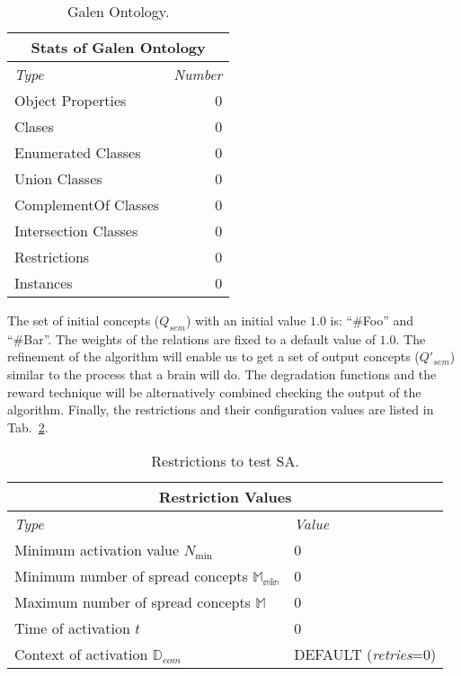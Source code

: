 \begin{longtable}[c]{|l|r|} 
\caption{Galen Ontology.}\label{table:info-ontologia}\\    
\hline
  \multicolumn{2}{|c|}{\textbf{Stats of Galen Ontology}}\\ \hline
  \textit{Type} &  \textit{Number} \\\hline

\endhead

    Object Properties&0 \\ \hline    
    Clases&0 \\ \hline
    Enumerated Classes&0 \\ \hline
    Union Classes&0 \\ \hline
    ComplementOf Classes&0 \\ \hline
    Intersection Classes&0 \\ \hline
    Restrictions&0 \\ \hline    
    Instances&0\\ \hline
\end{longtable}

The set of initial concepts ($Q_{sem}$) with an initial value $1.0$ is: ``\#Foo'' and ``\#Bar''. The weights of the 
relations are fixed to a default value of $1.0$. The refinement of the algorithm will enable us to get
a set of output concepts ($Q'_{sem}$) similar to the process that a brain will do. The degradation functions
and the reward technique will be alternatively combined checking the output of the algorithm. Finally, the restrictions 
and their configuration values are listed in Tab.~\ref{tabla:test-restricciones}.

\begin{table}[htb]
\renewcommand{\arraystretch}{1.3}
\begin{center}
\begin{tabular}{|p{8cm}|p{2cm}|}
\hline
        \multicolumn{2}{|c|}{\textbf{Restriction Values}}\\        
        \hline
        \textit{Type} &  \textit{Value} \\ \hline
    Minimum activation value $N_{\min}$ &0 \\ \hline
    Minimum number of spread concepts $\mathbb{M_{\min}}$&0 \\ \hline
    Maximum number of spread concepts $\mathbb{M}$&0 \\ \hline
    Time of activation $t$&0 \\ \hline
    Context of activation $\mathbb{D}_{com}$&DEFAULT (\textit{retries}=0)\\ \hline
   		\hline
		\end{tabular}
		\caption{Restrictions to test SA.}
		\label{tabla:test-restricciones}
  \end{center}
\end{table} 

